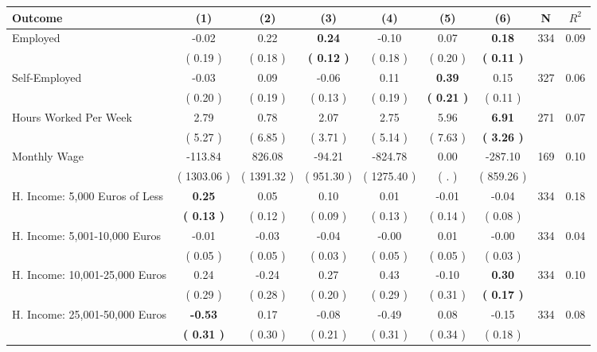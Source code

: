 \begin{tabular}{lcccccccc}
\toprule
 \textbf{Outcome} & \textbf{(1)} & \textbf{(2)} & \textbf{(3)} & \textbf{(4)} & \textbf{(5)} & \textbf{(6)} & \textbf{N} & \textbf{$ R^2$} \\
\midrule
Employed &     -0.02 &      0.22 & \textbf{     0.24} &     -0.10 &      0.07 & \textbf{     0.18} & 334 &       0.09 \\ 
 & (     0.19 ) & (     0.18 ) & \textbf{(     0.12 )} & (     0.18 ) & (     0.20 ) & \textbf{(     0.11 )} & \\
Self-Employed &     -0.03 &      0.09 &     -0.06 &      0.11 & \textbf{     0.39} &      0.15 & 327 &       0.06 \\ 
 & (     0.20 ) & (     0.19 ) & (     0.13 ) & (     0.19 ) & \textbf{(     0.21 )} & (     0.11 ) & \\
Hours Worked Per Week &      2.79 &      0.78 &      2.07 &      2.75 &      5.96 & \textbf{     6.91} & 271 &       0.07 \\ 
 & (     5.27 ) & (     6.85 ) & (     3.71 ) & (     5.14 ) & (     7.63 ) & \textbf{(     3.26 )} & \\
Monthly Wage &   -113.84 &    826.08 &    -94.21 &   -824.78 &      0.00 &   -287.10 & 169 &       0.10 \\ 
 & (  1303.06 ) & (  1391.32 ) & (   951.30 ) & (  1275.40 ) & (        . ) & (   859.26 ) & \\
H. Income: 5,000 Euros of Less & \textbf{     0.25} &      0.05 &      0.10 &      0.01 &     -0.01 &     -0.04 & 334 &       0.18 \\ 
 & \textbf{(     0.13 )} & (     0.12 ) & (     0.09 ) & (     0.13 ) & (     0.14 ) & (     0.08 ) & \\
H. Income: 5,001-10,000 Euros &     -0.01 &     -0.03 &     -0.04 &     -0.00 &      0.01 &     -0.00 & 334 &       0.04 \\ 
 & (     0.05 ) & (     0.05 ) & (     0.03 ) & (     0.05 ) & (     0.05 ) & (     0.03 ) & \\
H. Income: 10,001-25,000 Euros &      0.24 &     -0.24 &      0.27 &      0.43 &     -0.10 & \textbf{     0.30} & 334 &       0.10 \\ 
 & (     0.29 ) & (     0.28 ) & (     0.20 ) & (     0.29 ) & (     0.31 ) & \textbf{(     0.17 )} & \\
H. Income: 25,001-50,000 Euros & \textbf{    -0.53} &      0.17 &     -0.08 &     -0.49 &      0.08 &     -0.15 & 334 &       0.08 \\ 
 & \textbf{(     0.31 )} & (     0.30 ) & (     0.21 ) & (     0.31 ) & (     0.34 ) & (     0.18 ) & \\

\end{tabular}
